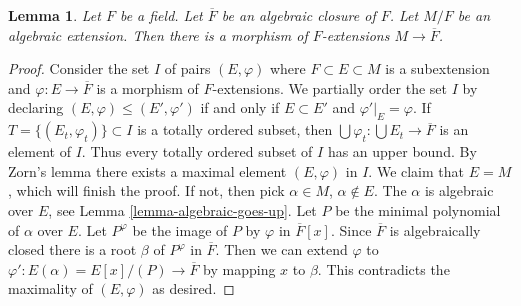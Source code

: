 \documentclass[10pt,a4paper]{amsart}
\theoremstyle{plain}
\newtheorem{lemma}[subsection]{Lemma}
\theoremstyle{definition}
\theoremstyle{remark}
\numberwithin{equation}{subsection}
\begin{document}
\begin{lemma}
\label{lemma-map-into-algebraic-closure}
Let $F$ be a field. Let $\overline{F}$ be an algebraic closure of $F$.
Let $M/F$ be an algebraic extension. Then there is a morphism of
$F$-extensions $M \to \overline{F}$.
\end{lemma}

\begin{proof}
Consider the set $I$ of pairs $(E, \varphi)$ where $F \subset E \subset M$
is a subextension and $\varphi : E \to \overline{F}$ is a morphism of
$F$-extensions. We partially order the set $I$ by declaring
$(E, \varphi) \leq (E', \varphi')$ if and only if $E \subset E'$ and
$\varphi'|_E = \varphi$. If $T = \{(E_t,  \varphi_t)\} \subset I$
is a totally ordered subset, then
$\bigcup \varphi_t : \bigcup E_t \to \overline{F}$ is an element of $I$.
Thus every totally ordered subset of $I$ has an upper bound.
By Zorn's lemma there exists a maximal element $(E, \varphi)$ in $I$.
We claim that $E = M$, which will finish the proof. If not, then
pick $\alpha \in M$, $\alpha \not \in E$. The $\alpha$ is algebraic
over $E$, see Lemma \ref{lemma-algebraic-goes-up}.
Let $P$ be the minimal polynomial of $\alpha$ over $E$.
Let $P^\varphi$ be the image of $P$ by $\varphi$ in $\overline{F}[x]$.
Since $\overline{F}$ is algebraically closed there is a root $\beta$
of $P^\varphi$ in $\overline{F}$. Then we can extend $\varphi$ to
$\varphi' : E(\alpha) = E[x]/(P) \to \overline{F}$ by mapping
$x$ to $\beta$. This contradicts the maximality of $(E, \varphi)$
as desired.
\end{proof}
\end{document}
